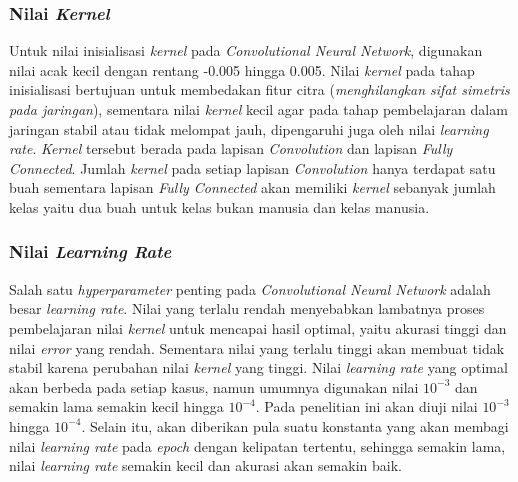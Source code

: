 \subsubsection{Nilai \textit{Kernel}}
\noindent Untuk nilai inisialisasi \textit{kernel} pada \textit{Convolutional Neural Network}, digunakan nilai acak kecil dengan rentang -0.005 hingga 0.005. Nilai \textit{kernel} pada tahap inisialisasi bertujuan untuk membedakan fitur citra (\textit{menghilangkan sifat simetris pada jaringan}), sementara nilai \textit{kernel} kecil agar pada tahap pembelajaran dalam jaringan stabil atau tidak melompat jauh, dipengaruhi juga oleh nilai \textit{learning rate}. \textit{Kernel} tersebut berada pada lapisan \textit{Convolution} dan lapisan \textit{Fully Connected}. Jumlah \textit{kernel} pada setiap lapisan \textit{Convolution} hanya terdapat satu buah sementara lapisan \textit{Fully Connected} akan memiliki \textit{kernel} sebanyak jumlah kelas yaitu dua buah untuk kelas bukan manusia dan kelas manusia.\\

\subsubsection{Nilai \textit{Learning Rate}}
\noindent Salah satu \textit{hyperparameter} penting pada \textit{Convolutional Neural Network} adalah besar \textit{learning rate}. Nilai yang terlalu rendah menyebabkan lambatnya proses pembelajaran nilai \textit{kernel} untuk mencapai hasil optimal, yaitu akurasi tinggi dan nilai \textit{error} yang rendah. Sementara nilai yang terlalu tinggi akan membuat tidak stabil karena perubahan nilai \textit{kernel} yang tinggi. Nilai \textit{learning rate} yang optimal akan berbeda pada setiap kasus, namun umumnya digunakan nilai $10^{-3}$ dan semakin lama semakin kecil hingga $10^{-4}$. Pada penelitian ini akan diuji nilai $10^{-3}$ hingga $10^{-4}$. Selain itu, akan diberikan pula suatu konstanta yang akan membagi nilai \textit{learning rate} pada \textit{epoch} dengan kelipatan tertentu, sehingga semakin lama, nilai \textit{learning rate} semakin kecil dan akurasi akan semakin baik.\\

